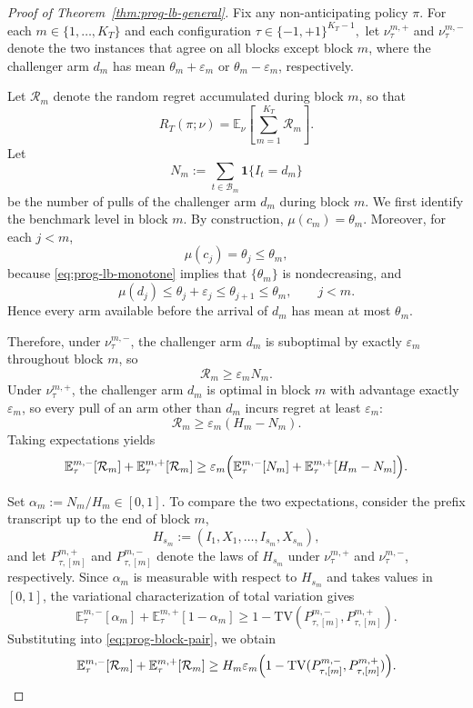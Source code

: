 \documentclass[
  12pt]{article}
\begin{document}
\begin{proof}[Proof of Theorem~\ref{thm:prog-lb-general}]
Fix any non-anticipating policy $\pi$.
For each $m\in\{1,\dots,K_T\}$ and each configuration
\(
\tau\in\{-1,+1\}^{K_T-1},
\)
let $\nu_{\tau}^{m,+}$ and $\nu_{\tau}^{m,-}$ denote the two instances that
agree on all blocks except block $m$, where the challenger arm $d_m$ has mean
$\theta_m+\varepsilon_m$ or $\theta_m-\varepsilon_m$, respectively.

Let $\mathcal R_m$ denote the random regret accumulated during block $m$, so
that
\[
R_T(\pi;\nu)
=
\mathbb E_\nu\!\left[\sum_{m=1}^{K_T} \mathcal R_m\right].
\]
Let
\[
N_m:=\sum_{t\in \mathcal{B}_m}\mathbf 1\{I_t=d_m\}
\]
be the number of pulls of the challenger arm $d_m$ during block $m$. We first identify the benchmark level in block $m$.
By construction, $\mu(c_m)=\theta_m$.
Moreover, for each $j<m$,
\[
\mu(c_j)=\theta_j\le \theta_m,
\]
because \eqref{eq:prog-lb-monotone} implies that $\{\theta_m\}$ is
nondecreasing, and
\[
\mu(d_j)\le \theta_j+\varepsilon_j\le \theta_{j+1}\le \theta_m,
\qquad j<m.
\]
Hence every arm available before the arrival of $d_m$ has mean at most
$\theta_m$.

Therefore, under $\nu_{\tau}^{m,-}$, the challenger arm $d_m$ is suboptimal by
exactly $\varepsilon_m$ throughout block $m$, so
\[
\mathcal R_m\ge \varepsilon_m N_m.
\]
Under $\nu_{\tau}^{m,+}$, the challenger arm $d_m$ is optimal in block $m$ with
advantage exactly $\varepsilon_m$, so every pull of an arm other than $d_m$
incurs regret at least $\varepsilon_m$:
\[
\mathcal R_m\ge \varepsilon_m(H_m-N_m).
\]
Taking expectations yields
\begin{equation}
\label{eq:prog-block-pair}
\mathbb E_{\tau}^{m,-}[\mathcal R_m]
+
\mathbb E_{\tau}^{m,+}[\mathcal R_m]
\ge
\varepsilon_m
\Bigl(
\mathbb E_{\tau}^{m,-}[N_m]
+
\mathbb E_{\tau}^{m,+}[H_m-N_m]
\Bigr).
\end{equation}

Set $\alpha_m:=N_m/H_m\in[0,1]$.
To compare the two expectations, consider the prefix transcript up to the end
of block $m$,
\[
H_{s_m}:=(I_1,X_1,\dots,I_{s_m},X_{s_m}),
\]
and let $P_{\tau,[m]}^{m,+}$ and $P_{\tau,[m]}^{m,-}$ denote the laws of
$H_{s_m}$ under $\nu_{\tau}^{m,+}$ and $\nu_{\tau}^{m,-}$, respectively.
Since $\alpha_m$ is measurable with respect to $H_{s_m}$ and takes values in
$[0,1]$, the variational characterization of total variation gives
\[
\mathbb E_{\tau}^{m,-}[\alpha_m]
+
\mathbb E_{\tau}^{m,+}[1-\alpha_m]
\ge
1-\mathrm{TV}(P_{\tau,[m]}^{m,-},P_{\tau,[m]}^{m,+}).
\]
Substituting into \eqref{eq:prog-block-pair}, we obtain
\begin{equation}
\label{eq:prog-block-tv}
\mathbb E_{\tau}^{m,-}[\mathcal R_m]
+
\mathbb E_{\tau}^{m,+}[\mathcal R_m]
\ge
H_m\varepsilon_m
\Bigl(
1-\mathrm{TV}(P_{\tau,[m]}^{m,-},P_{\tau,[m]}^{m,+})
\Bigr).
\end{equation}


\end{proof}
\end{document}
